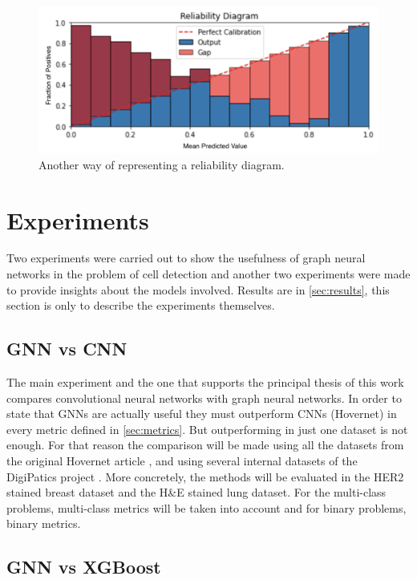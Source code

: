 \begin{figure}[ht]
    \centering
    \includegraphics[width=\textwidth]{imgs/rel2.png}
    \caption{Another way of representing a reliability diagram.}
    \label{fig:rel2}
\end{figure}

\section{Experiments}\label{sec:exp}

Two experiments were carried out to show the usefulness of graph neural networks in the problem of cell detection and another two experiments were made to provide insights about the models involved. Results are in \autoref{sec:results}, this section is only to describe the experiments themselves. 

\subsection{GNN vs CNN}

The main experiment and the one that supports the principal thesis of this work compares convolutional neural networks with graph neural networks. In order to state that GNNs are actually useful they must outperform CNNs (Hovernet) in every metric defined in \autoref{sec:metrics}. But outperforming in just one dataset is not enough. For that reason the comparison will be made using all the datasets from the original Hovernet article \cite{hovernet, gamper2020pannuke, 8880654}, and using several internal datasets of the DigiPatics project \cite{DigiPatics2022}. More concretely, the methods will be evaluated in the HER2 stained breast dataset and the H\&E stained lung dataset. For the multi-class problems, multi-class metrics will be taken into account and for binary problems, binary metrics.

\subsection{GNN vs XGBoost}

